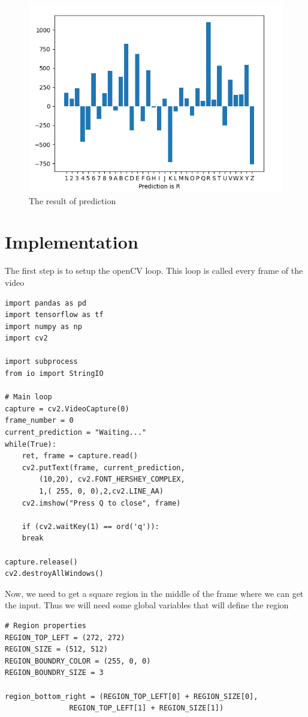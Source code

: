 \documentclass[a4paper,oneside,12pt]{report}
\begin{document}
\begin{figure}[htbp]
\centering
\includegraphics[width=.9\linewidth]{OpenCV_Application/2025-04-27_15-22-20_Screenshot 2025-03-18 121040.png}
\caption{\label{fig:org92a7249}The result of prediction}
\end{figure}

\section{Implementation}
\label{sec:org6987be3}
The first step is to setup the openCV loop. This loop is called every frame of the video
\begin{verbatim}
import pandas as pd
import tensorflow as tf
import numpy as np
import cv2

import subprocess
from io import StringIO

# Main loop
capture = cv2.VideoCapture(0)
frame_number = 0
current_prediction = "Waiting..."
while(True):
    ret, frame = capture.read()
    cv2.putText(frame, current_prediction,
		(10,20), cv2.FONT_HERSHEY_COMPLEX,
		1,( 255, 0, 0),2,cv2.LINE_AA)
    cv2.imshow("Press Q to close", frame)

    if (cv2.waitKey(1) == ord('q')):
	break

capture.release()
cv2.destroyAllWindows()
\end{verbatim}

Now, we need to get a square region in the middle of the frame where we can get the input. Thus we will need some global variables that will define the region
\begin{verbatim}
# Region properties
REGION_TOP_LEFT = (272, 272)
REGION_SIZE = (512, 512)
REGION_BOUNDRY_COLOR = (255, 0, 0)
REGION_BOUNDRY_SIZE = 3

region_bottom_right = (REGION_TOP_LEFT[0] + REGION_SIZE[0],
		       REGION_TOP_LEFT[1] + REGION_SIZE[1])
\end{verbatim}
\end{document}
